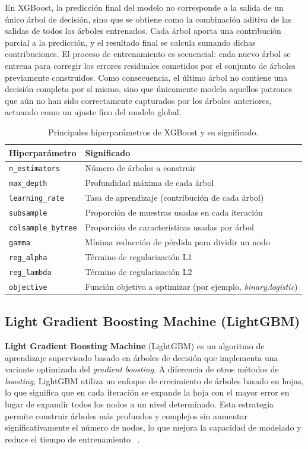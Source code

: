 En XGBoost, la predicción final del modelo no corresponde a la salida de un único árbol de decisión, sino que se obtiene como la combinación aditiva de las salidas de todos los árboles entrenados. Cada árbol aporta una contribución parcial a la predicción, y el resultado final se calcula sumando dichas contribuciones.
El proceso de entrenamiento es secuencial: cada nuevo árbol se entrena para corregir los errores residuales cometidos por el conjunto de árboles previamente construidos. Como consecuencia, el último árbol no contiene una decisión completa por sí mismo, sino que únicamente modela aquellos patrones que aún no han sido correctamente capturados por los árboles anteriores, actuando como un ajuste fino del modelo global.

\begin{table}[H]
    \centering
    \caption{Principales hiperparámetros de XGBoost y su significado.}
    \label{tab:xgboost_hyperparams}
    \begin{tabular}{ll}
        \toprule
        \textbf{Hiperparámetro} & \textbf{Significado} \\
        \midrule
        \texttt{n\_estimators} & Número de árboles a construir \\
        \texttt{max\_depth} & Profundidad máxima de cada árbol \\
        \texttt{learning\_rate} & Tasa de aprendizaje (contribución de cada árbol) \\
        \texttt{subsample} & Proporción de muestras usadas en cada iteración \\
        \texttt{colsample\_bytree} & Proporción de características usadas por árbol \\
        \texttt{gamma} & Mínima reducción de pérdida para dividir un nodo \\
        \texttt{reg\_alpha} & Término de regularización L1 \\
        \texttt{reg\_lambda} & Término de regularización L2 \\
        \texttt{objective} & Función objetivo a optimizar (por ejemplo, \textit{binary:logistic}) \\
        \bottomrule
    \end{tabular}
\end{table}

\subsection{Light Gradient Boosting Machine (LightGBM)}
\textbf{Light Gradient Boosting Machine} (LightGBM) es un algoritmo de aprendizaje supervisado basado en árboles de decisión que implementa una variante optimizada del \textit{gradient boosting}. A diferencia de otros métodos de \textit{boosting}, LightGBM utiliza un enfoque de crecimiento de árboles basado en hojas, lo que significa que en cada iteración se expande la hoja con el mayor error en lugar de expandir todos los nodos a un nivel determinado. Esta estrategia permite construir árboles más profundos y complejos sin aumentar significativamente el número de nodos, lo que mejora la capacidad de modelado y reduce el tiempo de entrenamiento ~\cite{lightgbm}.

